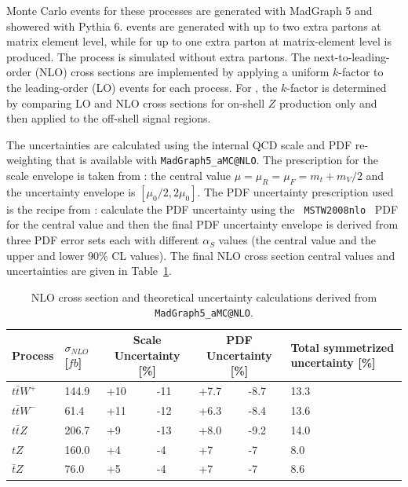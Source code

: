 Monte Carlo events for these processes are generated with MadGraph 5 and showered with Pythia 6.  \ttW events are generated with up to two extra partons at matrix element level, while for \ttZ up to one extra parton at matrix-element level is produced.  The \tZ process is simulated without extra partons.  The next-to-leading-order (NLO) cross sections are implemented by applying a uniform $k$-factor to the leading-order (LO) events for each process.  For \ttZ, the $k$-factor is determined by comparing LO and NLO cross sections for on-shell $Z$ production only and then applied to the off-shell signal regions.  

The \ttV uncertainties are calculated
using the internal QCD scale and PDF re-weighting that is available with
{\tt MadGraph5\_aMC@NLO}. The prescription for the scale envelope is taken from
\cite{Garzelli:2012bn}: the central value $\mu=\mu_{R}=\mu_{F}=m_t+m_V/2$
and the uncertainty envelope is $[\mu_{0}/2,2\mu_{0}]$. The PDF
uncertainty prescription used is the recipe from
\cite{Campbell:2012dh}: calculate the PDF uncertainty using the {\tt
MSTW2008nlo}~\cite{Martin:2009iq} PDF for the central value and then the final PDF
uncertainty envelope is derived from three PDF error sets each with
different $\alpha_S$ values (the central value and the upper and lower
90\% CL values). The final NLO cross section central values and
uncertainties are given in Table~\ref{tab:ttVXSunc}.

\begin{table}%
\begin{center}
\caption{NLO cross section and theoretical uncertainty
  calculations derived from {\tt MadGraph5\_aMC@NLO}.}
\label{tab:ttVXSunc}
\begin{tabular}{l|p{}|p{}|p{}|p{}|p{}|p{}}
\hline
Process & $\sigma_{NLO}$ [$fb$] & \multicolumn{2}{c|}{Scale
Uncertainty [\%]} & \multicolumn{2}{c|}{PDF Uncertainty [\%]} & Total
symmetrized uncertainty [\%] \\
\hline
\hline
$t\bar{t}W^{+}$ & 144.9 & +10 & -11 & +7.7 & -8.7 & 13.3 \\
$t\bar{t}W^{-}$ & 61.4  & +11 & -12 & +6.3 & -8.4 & 13.6 \\
$t\bar{t}Z$     & 206.7 & +9  & -13 & +8.0 & -9.2 & 14.0 \\
$tZ$            & 160.0 & +4  & -4  & +7   & -7   & 8.0 \\
$\bar{t}Z$      & 76.0  & +5  & -4  & +7   & -7   & 8.6 \\
\hline
\end{tabular}
\end{center}
\end{table}

